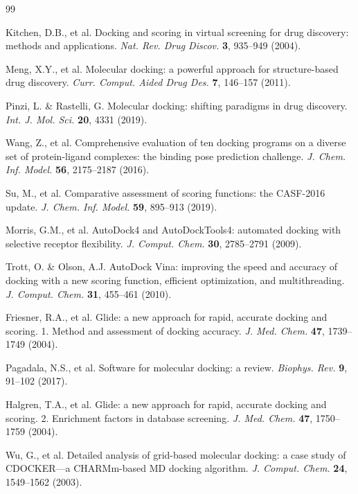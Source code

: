 \documentclass[11pt,a4paper]{article}
\begin{document}
\begin{thebibliography}{99}

Kitchen, D.B., et al. Docking and scoring in virtual screening for drug discovery: methods and applications. \textit{Nat. Rev. Drug Discov.} \textbf{3}, 935--949 (2004).

Meng, X.Y., et al. Molecular docking: a powerful approach for structure-based drug discovery. \textit{Curr. Comput. Aided Drug Des.} \textbf{7}, 146--157 (2011).

Pinzi, L. \& Rastelli, G. Molecular docking: shifting paradigms in drug discovery. \textit{Int. J. Mol. Sci.} \textbf{20}, 4331 (2019).

Wang, Z., et al. Comprehensive evaluation of ten docking programs on a diverse set of protein-ligand complexes: the binding pose prediction challenge. \textit{J. Chem. Inf. Model.} \textbf{56}, 2175--2187 (2016).

Su, M., et al. Comparative assessment of scoring functions: the CASF-2016 update. \textit{J. Chem. Inf. Model.} \textbf{59}, 895--913 (2019).

Morris, G.M., et al. AutoDock4 and AutoDockTools4: automated docking with selective receptor flexibility. \textit{J. Comput. Chem.} \textbf{30}, 2785--2791 (2009).

Trott, O. \& Olson, A.J. AutoDock Vina: improving the speed and accuracy of docking with a new scoring function, efficient optimization, and multithreading. \textit{J. Comput. Chem.} \textbf{31}, 455--461 (2010).

Friesner, R.A., et al. Glide: a new approach for rapid, accurate docking and scoring. 1. Method and assessment of docking accuracy. \textit{J. Med. Chem.} \textbf{47}, 1739--1749 (2004).

Pagadala, N.S., et al. Software for molecular docking: a review. \textit{Biophys. Rev.} \textbf{9}, 91--102 (2017).

Halgren, T.A., et al. Glide: a new approach for rapid, accurate docking and scoring. 2. Enrichment factors in database screening. \textit{J. Med. Chem.} \textbf{47}, 1750--1759 (2004).

Wu, G., et al. Detailed analysis of grid-based molecular docking: a case study of CDOCKER—a CHARMm-based MD docking algorithm. \textit{J. Comput. Chem.} \textbf{24}, 1549--1562 (2003).

\end{thebibliography}
\end{document}
